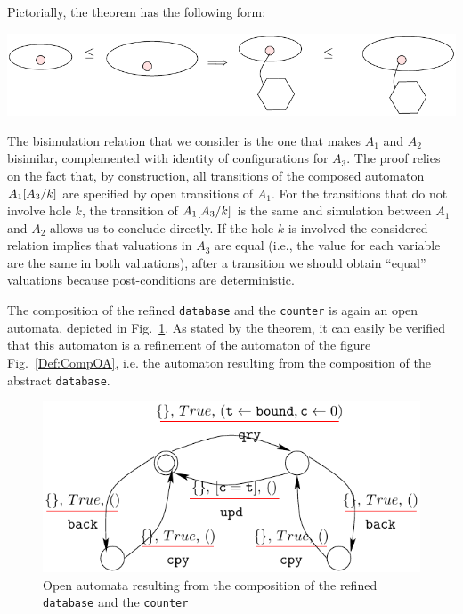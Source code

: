 \documentclass[runningheads]{llncs}
\begin{document}
Pictorially, the theorem has the following form:

\begin{center}
\includegraphics[scale=0.7]{Figures/Thm2intuition}
\end{center}

%
%
%
%


The bisimulation relation that we consider is the one that makes $A_1$ and $A_2$ bisimilar, complemented with identity of configurations for $A_3$.
The proof relies on the fact that, by construction, all transitions of the composed automaton $A_1{\left[A_3\middle/k\right]}$ are specified by open transitions of $A_1$. For the transitions that do not involve hole $k$, the transition of $A_1{\left[A_3\middle/k\right]}$ is the same and simulation between $A_1$ and $A_2$ allows us to conclude directly. If the hole $k$ is involved the considered relation  implies that valuations in $A_3$ are equal (i.e., the value for each variable are the same in both valuations), after a transition we should obtain ``equal'' valuations because post-conditions are deterministic.
\begin{example} The composition of the refined \texttt{database} and the \texttt{counter} is again an open automata, depicted in Fig.~\ref{Fig:ComposeRefine}. As stated by the theorem,  it can easily be verified that this automaton is a refinement of the automaton of the figure Fig.~\ref{Def:CompOA}, i.e. the automaton resulting from the composition of the abstract \texttt{database}.
\end{example}


\begin{figure}[h]
 \centering
   \includegraphics[width=.6\textwidth]{Figures/composeRefined.pdf}
   \caption{Open automata resulting from the composition of the  refined  \texttt{database} and the \texttt{counter} \label{Fig:ComposeRefine}}
\end{figure}
\end{document}
